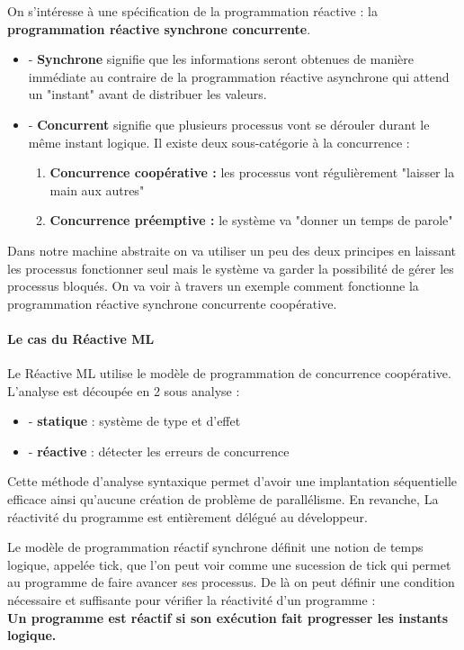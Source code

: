 \documentclass[10pt,a4paper]{article}
\begin{document}
			On s'intéresse à une spécification de la programmation réactive : la \textbf{programmation réactive synchrone concurrente}.
			\begin{itemize}
				\item[] - \textbf{Synchrone} signifie que les informations seront obtenues de manière immédiate au contraire de la programmation réactive asynchrone qui attend un "instant" avant de distribuer les valeurs. 
				\item[] - \textbf{Concurrent} signifie que plusieurs processus vont se dérouler durant le même instant logique. Il existe deux sous-catégorie à la concurrence :
				\begin{enumerate}
					\item \textbf{Concurrence coopérative :} les processus vont régulièrement "laisser la main aux autres"
					\item \textbf{Concurrence préemptive :} le système va "donner un temps de parole"
				\end{enumerate}
			\end{itemize}
			\smallbreak
			Dans notre machine abstraite on va utiliser un peu des deux principes en laissant les processus fonctionner seul mais le système va garder la possibilité de gérer les processus bloqués. On va voir à travers un exemple comment fonctionne la programmation réactive synchrone concurrente coopérative.
		
			\paragraph{Le cas du Réactive ML}
				Le Réactive ML utilise le modèle de programmation de concurrence coopérative. 
				\smallbreak
				L'analyse est découpée en 2 sous analyse :
				\begin{itemize}
					\item[] - \textbf{statique} : système de type et d'effet
					\item[] - \textbf{réactive} : détecter les erreurs de concurrence
				\end{itemize}
				\medbreak
				
				Cette méthode d'analyse syntaxique permet d'avoir une implantation séquentielle efficace ainsi qu'aucune création de problème de parallélisme. En revanche, La réactivité du programme est entièrement délégué au développeur.
				\medbreak
				
				Le modèle de programmation réactif synchrone définit une notion de temps logique, appelée tick, que l'on peut voir comme une sucession de tick qui permet au programme de faire avancer ses processus. De là on peut définir une condition nécessaire et suffisante pour vérifier la réactivité d'un programme : 	
				\\\textbf{Un programme est r\'{e}actif si son ex\'{e}cution fait progresser les instants logique.}
				\medbreak
					
\end{document}
